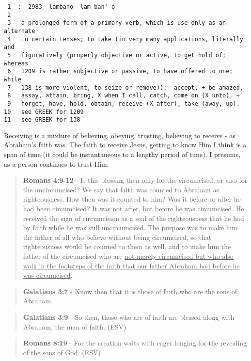 \documentclass[11pt]{article}
\begin{document}
\begin{verbatim}
 1  :  2983  lambano  lam-ban'-o
 2  
 3   a prolonged form of a primary verb, which is use only as an alternate
 4   in certain tenses; to take (in very many applications, literally and
 5   figuratively (properly objective or active, to get hold of; whereas
 6   1209 is rather subjective or passive, to have offered to one; while
 7   138 is more violent, to seize or remove)):--accept, + be amazed,
 8   assay, attain, bring, X when I call, catch, come on (X unto), +
 9   forget, have, hold, obtain, receive (X after), take (away, up).
10   see GREEK for 1209
11   see GREEK for 138
\end{verbatim}

Receiving is a mixture of believing, obeying, trusting, believing to receive - as Abraham's faith was. The faith to receive Jesus, getting to know Him I think is a span of time (it could be instantaneous to a lengthy period of time), I presume, as a person continues to trust Him:

\begin{quote}
\textbf{Romans 4:9-12} - Is this blessing then only for the circumcised, or also for the uncircumcised? We say that faith was counted to Abraham as righteousness. How then was it counted to him? Was it before or after he had been circumcised? It was not after, but before he was circumcised. He received the sign of circumcision as a seal of the righteousness that he had by faith while he was still uncircumcised. The purpose was to make him the father of all who believe without being circumcised, so that righteousness would be counted to them as well, and to make him the father of the circumcised who are \uline{not merely circumcised but who also walk in the footsteps of the faith that our father Abraham had before he was circumcised}.
\end{quote}

\begin{quote}
\textbf{Galatians 3:7} - Know then that it is those of faith who are the sons of Abraham.
\end{quote}

\begin{quote}
\textbf{Galatians 3:9} - So then, those who are of faith are blessed along with Abraham, the man of faith. (ESV)
\end{quote}

\begin{quote}
\textbf{Romans 8:19} - For the creation waits with eager longing for the revealing of the sons of God. (ESV)
\end{quote}
\end{document}
